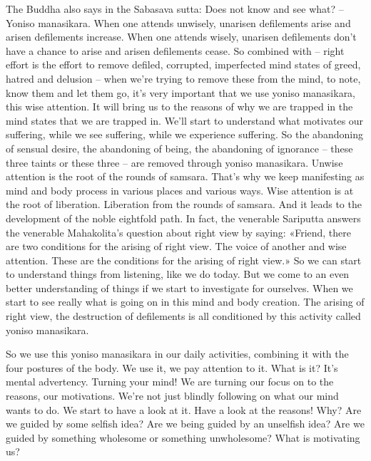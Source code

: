 \documentclass[letterpaper,10pt,english]{sphinxmanual}
\begin{document}
\sphinxAtStartPar
The Buddha also says in the Sabasava sutta:
Does not know and see what? – Yoniso manasikara. When one
attends unwisely, unarisen defilements arise and arisen defilements increase.
When one attends wisely, unarisen defilements don’t have a chance to arise
and arisen defilements cease. So combined with
– right effort is
the  effort  to  remove  defiled,  corrupted,  imperfected  mind  states  of  greed,
hatred  and  delusion  –  when  we’re  trying  to  remove  these  from  the  mind,
to note, know them and let them go, it’s very important that we use yoniso
manasikara, this wise attention. It will bring us to the reasons of why we are
trapped in the mind states that we are trapped in. We’ll start to understand
what motivates our suffering, while we see suffering, while we experience
suffering.  So  the  abandoning  of  sensual  desire,  the  abandoning  of  being,
the  abandoning  of  ignorance  –  these  three  taints  or  these  three
–
are removed through yoniso manasikara. Unwise attention is the root of the
rounds of samsara.
That’s  why  we  keep
manifesting as mind and body process in various places and various ways.
Wise  attention  is  at  the  root  of  liberation.  Liberation  from  the  rounds  of
samsara. And it leads to the development of the noble eightfold path. In fact,
the venerable Sariputta answers the venerable Mahakolita’s question about
right  view  by  saying:  «Friend,  there  are  two  conditions  for  the  arising  of
right view. The voice of another and wise attention. These are the conditions
for  the  arising  of  right  view.»  So  we  can  start  to  understand  things  from
listening,  like  we  do  today.  But  we  come  to  an  even  better  understanding
of things if we start to investigate for ourselves. When we start to see really
what is going on in this mind and body creation. The arising of right view,
  the destruction of defilements is all conditioned by this activity called yoniso
manasikara.

\sphinxAtStartPar
So we use this yoniso manasikara in our daily activities, combining it
with the four postures of the body. We use it, we pay attention to it. What
is it? It’s mental advertency. Turning your mind! We are turning our focus
on to the reasons, our motivations. We’re not just blindly following on what
our mind wants to do. We start to have a look at it. Have a look at the reasons! Why? Are we guided by some selfish idea? Are we being guided by
an  unselfish  idea? Are  we  guided  by  something  wholesome  or  something
unwholesome? What is motivating us?
\end{document}
